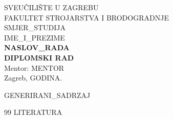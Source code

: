 \documentclass[12pt,a4paper]{article}
\begin{document}
\begin{titlepage}
    \begin{center}
        {\large SVEUČILIŠTE U ZAGREBU} \\
        {\large FAKULTET STROJARSTVA I BRODOGRADNJE} \\
        \vspace{4cm}
        {\large {{SMJER_STUDIJA}}} \\
        \vspace{2cm}
        {\large {{IME_I_PREZIME}}} \\
        \vspace{2cm}
        {\Huge \textbf{{{NASLOV_RADA}}}} \\
        \vspace{1cm}
        {\Large \textbf{DIPLOMSKI RAD}} \\
        \vfill
        {\large Mentor: {{MENTOR}}} \\
        \vspace{2cm}
        {\large Zagreb, {{GODINA}}.}
    \end{center}
\end{titlepage}

\tableofcontents
\newpage
\listoffigures
\newpage
\listoftables
\newpage


{{GENERIRANI_SADRZAJ}}

\newpage
\begin{thebibliography}{99}
{{LITERATURA}}
\end{thebibliography}
\end{document}

